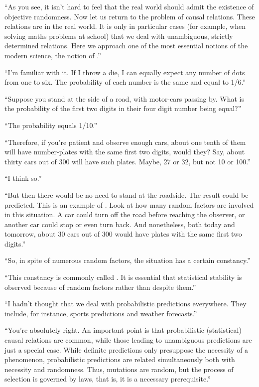\begin{dialogue}
\athr  ``As you see, it isn't hard to feel that the real
  world should admit the existence of objective randomness. Now let us
  return to the problem of causal relations. These relations are
   in the real world. It is only in particular cases (for
  example, when solving maths problems at school) that we deal with
  unambiguous, strictly determined relations. Here we approach one of
  the most essential notions of the modern science, the notion of
  .''

\rdr  ``I'm familiar with it. If I throw a die, I can
  equally expect any number of dots from one to six. The probability
  of each number is the same and equal to 1/6.''

\athr  ``Suppose you stand at the side of a road, with
  motor-cars passing by. What is the probability of the first two
  digits in their four digit number being equal?''

\rdr  ``The probability equals 1/10.''

\athr  ``Therefore, if you're patient and observe enough
  cars, about one tenth of them will have number-plates with the same
  first two digits, would they? Say, about thirty cars out of 300 will
  have such plates. Maybe, 27 or 32, but not 10 or 100.''

\rdr  ``I think so.''

\athr  ``But then there would be no need to stand at the roadside.
The result could be predicted. This is an example of . Look at how many random factors are involved in this situation. A car could turn off the road before reaching the observer,
or another car could stop or even turn back. And nonetheless, both
today and tomorrow, about 30 cars out of 300 would have plates with
the same first two digits.''

\rdr ``So, in spite of numerous random factors, the
  situation has a certain constancy.''
  
\athr  ``This constancy is commonly called . It is essential that statistical stability is observed
  because of random factors rather than despite them.''

\rdr  ``I hadn't thought that we deal with probabilistic
  predictions everywhere. They include, for instance, sports
  predictions and weather forecasts.''

\athr  ``You're absolutely right. An important point is
  that probabilistic (statistical) causal relations are common, while
  those leading to unambiguous predictions are just a special
  case. While definite predictions only presuppose the necessity of a
  phenomenon, probabilistic predictions are related simultaneously
  both with necessity and randomness. Thus, mutations are random, but
  the process of selection is governed by laws, that is, it is a
  necessary prerequisite.''


\end{dialogue}
